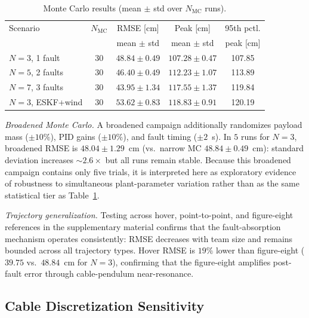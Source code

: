 \begin{table}[t]
\centering
\caption{Monte Carlo results (mean $\pm$ std over $N_{\mathrm{MC}}$ runs).}
\label{tab:monte_carlo}
\begingroup
\setlength{\tabcolsep}{3.5pt}
\renewcommand{\arraystretch}{0.96}
\footnotesize
\begin{tabular}{@{}lcccc@{}}
\toprule
Scenario & $N_{\mathrm{MC}}$ & RMSE [cm] & Peak [cm] & 95th pctl. \\
         &                    & mean $\pm$ std & mean $\pm$ std & peak [cm] \\
\midrule
$N{=}3$, 1 fault   & 30 & $48.84 \pm 0.49$ & $107.28 \pm 0.47$ & 107.85 \\
$N{=}5$, 2 faults  & 30 & $46.40 \pm 0.49$ & $112.23 \pm 1.07$ & 113.89 \\
$N{=}7$, 3 faults  & 30 & $43.95 \pm 1.34$ & $117.55 \pm 1.37$ & 119.84 \\
$N{=}3$, ESKF+wind & 30 & $53.62 \pm 0.83$ & $118.83 \pm 0.91$ & 120.19 \\
\bottomrule
\end{tabular}
\endgroup
\end{table}

\emph{Broadened Monte Carlo.}\label{sec:broadened_mc}
A broadened campaign additionally randomizes payload mass (${\pm}10\%$), PID gains (${\pm}10\%$), and fault timing (${\pm}2$~s). In $5$ runs for $N{=}3$, broadened RMSE is $48.04 \pm 1.29$~cm (vs.\ narrow MC $48.84 \pm 0.49$~cm): standard deviation increases ${\sim}2.6\times$ but all runs remain stable. Because this broadened campaign contains only five trials, it is interpreted here as exploratory evidence of robustness to simultaneous plant-parameter variation rather than as the same statistical tier as Table~\ref{tab:monte_carlo}.

\emph{Trajectory generalization.}\label{sec:trajectory_generalization}
Testing across hover, point-to-point, and figure-eight references in the supplementary material confirms that the fault-absorption mechanism operates consistently: RMSE decreases with team size and remains bounded across all trajectory types. Hover RMSE is $19\%$ lower than figure-eight ($39.75$ vs.\ $48.84$~cm for $N{=}3$), confirming that the figure-eight amplifies post-fault error through cable-pendulum near-resonance.

\subsection{Cable Discretization Sensitivity}
\label{sec:bead_discretization}

